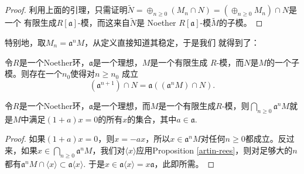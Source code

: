 \begin{proof}
利用上面的引理，只需证明$\tilde{N}=\oplus_{n\geq 0}(M_n\cap N)=
(\oplus_{n\geq 0}M_n)\cap N$是一个
有限生成$R[\mathfrak a]$-模，而这来自$\tilde N$是
Noether $R[\mathfrak a]$-模$\tilde M$的子模。
\end{proof}

特别地，取$M_n=\mathfrak a^n M$，从定义直接知道其稳定，于是我们
就得到了：

\begin{pro}\label{artin-rees}
令$R$是一个Noether环，$\mathfrak a$是一个理想，$M$是一个有限生成
$R$-模，而$N$是$M$的一个子模。则存在一个$n_0$使得对$n\geq n_0$
成立
\[
	(\mathfrak a^{n+1})\cap N=\mathfrak a
	((\mathfrak a^n M)\cap N).
\]
\end{pro}

\begin{lem}[Krull]
	令$R$是一个Noether环，$\mathfrak a$是一个理想，而$M$是一个有限生成$R$-模，则$\bigcap_{n\geq 0}\mathfrak a^nM$就是$M$中满足$(1+a)x=0$的所有$x$的集合，其中$a\in \mathfrak a$.
	\end{lem}
	
	\begin{proof}
		如果$(1+a)x=0$，则$x=-ax$，所以$x\in \mathfrak a^n M$对任何$n\geq 0$都成立。反过来，如果$x \in \bigcap_{n\geq 0}\mathfrak a^nM$，我们对$\langle x\rangle$应用Proposition \ref{artin-rees}，则对足够大的$n$都有$\mathfrak a^n M\cap \langle x\rangle \subset \mathfrak a \langle x\rangle$. 于是$x\in \mathfrak a \langle x\rangle=x\mathfrak a$，此即所需。
	\end{proof}